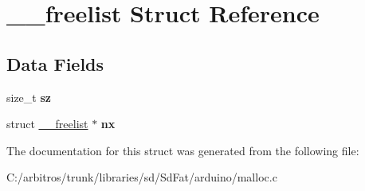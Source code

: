 \hypertarget{struct____freelist}{\section{\-\_\-\-\_\-freelist Struct Reference}
\label{struct____freelist}
}
\subsection*{Data Fields}
\begin{DoxyCompactItemize}
\item 
\hypertarget{struct____freelist_aad50db3bff52eed270f16ef9e6acd8b1}{size\-\_\-t {\bfseries sz}}\label{struct____freelist_aad50db3bff52eed270f16ef9e6acd8b1}

\item 
\hypertarget{struct____freelist_ae718f53598ce7902b5c21759e2d0a2ec}{struct \hyperlink{struct____freelist}{\-\_\-\-\_\-freelist} $\ast$ {\bfseries nx}}\label{struct____freelist_ae718f53598ce7902b5c21759e2d0a2ec}

\end{DoxyCompactItemize}


The documentation for this struct was generated from the following file\-:\begin{DoxyCompactItemize}
\item 
C\-:/arbitros/trunk/libraries/sd/\-Sd\-Fat/arduino/malloc.\-c\end{DoxyCompactItemize}
